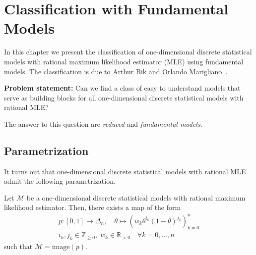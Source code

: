\chapter{Classification with Fundamental Models}

In this chapter we present the classification of one-dimensional discrete statistical models with rational maximum likelihood estimator (MLE) using fundamental models. The classification is due to Arthur Bik and Orlando Marigliano~\cite{bik2022classifying}. 

\begin{center}
    \textbf{Problem statement:} Can we find a class of easy to understand models that serve as building blocks for all one-dimensional discrete statistical models with rational MLE?
\end{center}
The answer to this question are \emph{reduced} and \emph{fundamental models}.

\section{Parametrization}

It turns out that one-dimensional discrete statistical models with rational MLE admit the following parametrization.

\begin{proposition}\label{prop:parametrization}
    Let \( \mathcal{M} \) be a one-dimensional discrete statistical models with rational maximum likelihood estimator. Then, there exists a map of the form
    \begin{gather*}
        p: [0,1] \to \Delta_n, \quad \theta \mapsto (w_k \theta^{i_k} (1-\theta)^{j_k})_{k=0}^n \\
        i_k, j_k \in \mathbb{Z}_{\geq 0}, \;  w_k \in \mathbb{R}_{> 0} \quad \forall k = 0, \dots, n
    \end{gather*}
    such that \( \mathcal{M} = \mathrm{image}(p) \).
\end{proposition}

